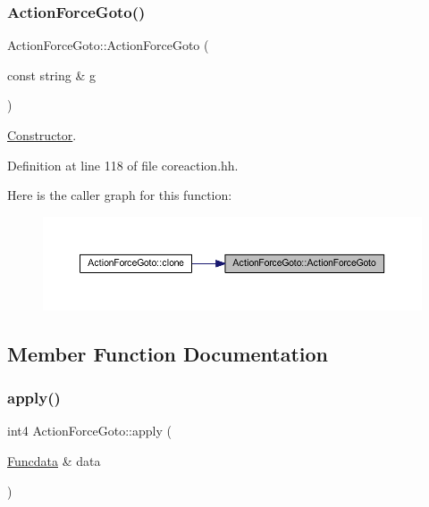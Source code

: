 \subsubsection{\texorpdfstring{ActionForceGoto()}{ActionForceGoto()}}
{\footnotesize\ttfamily Action\+Force\+Goto\+::\+Action\+Force\+Goto (\begin{DoxyParamCaption}\item[{const string \&}]{g }\end{DoxyParamCaption})\hspace{0.3cm}{\ttfamily [inline]}}



\mbox{\hyperlink{class_constructor}{Constructor}}. 



Definition at line 118 of file coreaction.\+hh.

Here is the caller graph for this function\+:
\nopagebreak
\begin{figure}[H]
\begin{center}
\leavevmode
\includegraphics[width=350pt]{class_action_force_goto_a0e90d0ee175cf04cd02a21fd6e027fbf_icgraph}
\end{center}
\end{figure}


\subsection{Member Function Documentation}
\mbox{\label{class_action_force_goto_af7842a93290323e3bb92dcd62c9a66cc}} 
\subsubsection{\texorpdfstring{apply()}{apply()}}
{\footnotesize\ttfamily int4 Action\+Force\+Goto\+::apply (\begin{DoxyParamCaption}\item[{\mbox{\hyperlink{class_funcdata}{Funcdata}} \&}]{data }\end{DoxyParamCaption})\hspace{0.3cm}{\ttfamily [virtual]}}



